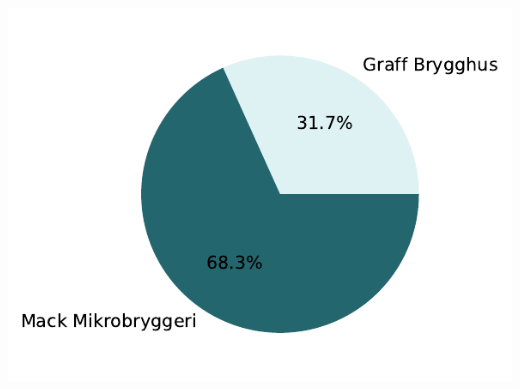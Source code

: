 \documentclass[
  12pt,
  a4paper,
  DIV=11,
  numbers=noendperiod]{scrartcl}
\begin{document}
\includegraphics{18_SOK2030_mappeoppgave_2_V24_files/figure-pdf/cell-40-output-1.pdf}
\end{document}
